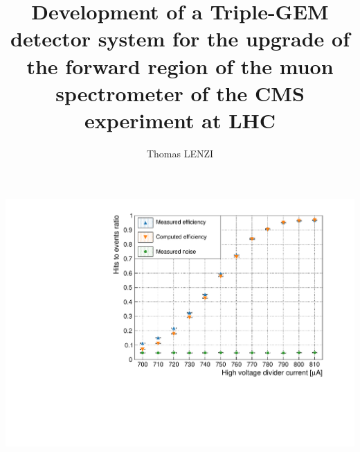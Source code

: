 \documentclass[a4paper, english, 11pt, twoside]{memoir}
\title{Development of a Triple-GEM detector system for the upgrade of the forward region of the muon spectrometer of the CMS experiment at LHC}
\author{Thomas LENZI}
\date{}
\begin{document}


    \includegraphics[width=\textwidth]{plots/cEfficiency_HV_GEM0.pdf}


% 	




% 	


% 	






% 	

% 	

% 	

% 	

% 	





% 	

% 	
\end{document}
